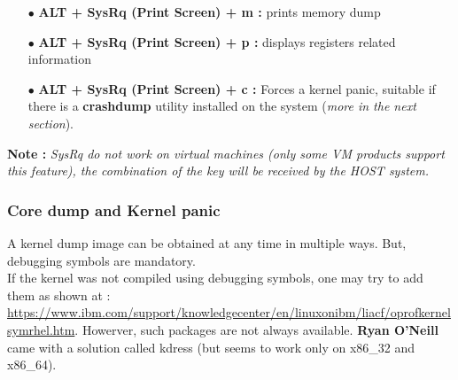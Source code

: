 \begin{itemize}
\begin{itemize}
		
		\item[$\bullet$] \textbf{ALT + SysRq (Print Screen) + m :} prints memory dump
		\item[$\bullet$] \textbf{ALT + SysRq (Print Screen) + p :} displays registers related information
		\item[$\bullet$] \textbf{ALT + SysRq (Print Screen) + c :} Forces a kernel panic, suitable if there is a \textbf{crashdump} utility installed on the system (\emph{more in the next section}).
	\end{itemize}
\end{itemize}



\textbf{\color{orange}Note :} \emph{\color{red}SysRq do not work on virtual machines (only some VM products support this feature), the combination of the key will be received by the HOST system.}

\subsubsection{Core dump and Kernel panic}
A kernel dump image can be obtained at any time in multiple ways. But, debugging symbols are mandatory.\\
If the kernel was not compiled using debugging symbols, one may try to add them as shown at : {\color{blue}\url{https://www.ibm.com/support/knowledgecenter/en/linuxonibm/liacf/oprofkernelsymrhel.htm}}. Howerver, such packages are not always available. \textbf{Ryan O'Neill} came with a solution called kdress (but seems to work only on x86\_32 and x86\_64).


